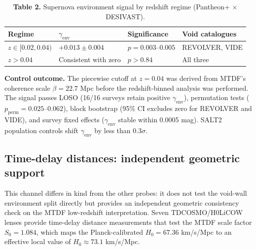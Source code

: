\documentclass[11pt,a4paper]{article}
\begin{document}
\begin{table}[H]
\centering
\footnotesize
\caption{\textbf{Table 2.} Supernova environment signal by redshift regime (Pantheon+ $\times$ DESIVAST).}
\begin{tabularx}{\linewidth}{l>{\RaggedRight\arraybackslash}X>{\RaggedRight\arraybackslash}X>{\RaggedRight\arraybackslash}X}
\toprule
\textbf{Regime} & \textbf{\(\gamma_\mathrm{env}\)} & \textbf{Significance} & \textbf{Void catalogues} \tabularnewline
\midrule
\(z \in [0.02, 0.04)\) & \(+0.013 \pm 0.004\) & \(p = 0.003\text{--}0.005\) & REVOLVER, VIDE \tabularnewline
\(z > 0.04\) & Consistent with zero & \(p > 0.84\) & All three \tabularnewline
\bottomrule
\end{tabularx}
\end{table}

\begin{mdframed}[linecolor=accent,linewidth=0.5pt,backgroundcolor=callout-bg,leftline=true,rightline=true,topline=true,bottomline=true,innerleftmargin=8pt,innerrightmargin=8pt,innertopmargin=6pt,innerbottommargin=6pt]
\textbf{Control outcome.} The piecewise cutoff at \(z = 0.04\) was derived from MTDF's coherence scale \(\beta = 22.7\) Mpc before the redshift-binned analysis was performed. The signal passes LOSO (16/\allowbreak{}16 surveys retain positive \(\gamma_\mathrm{env}\)), permutation tests (\(p_\mathrm{perm} = 0.025\text{--}0.062\)), block bootstrap (95\% CI excludes zero for REVOLVER and VIDE), and survey fixed effects (\(\gamma_\mathrm{env}\) stable within 0.0005 mag). SALT2 population controls shift \(\gamma_\mathrm{env}\) by less than 0.3\(\sigma\).
\end{mdframed}

\subsection{Time-delay distances: independent geometric support}
This channel differs in kind from the other probes: it does not test the void-wall environment split directly but provides an independent geometric consistency check on the MTDF low-redshift interpretation. Seven TDCOSMO/\allowbreak{}H0LiCOW lenses provide time-delay distance measurements that test the MTDF scale factor \(S_0 = 1.084\), which maps the Planck-calibrated \(H_0 = 67.36\) km/\allowbreak{}s/\allowbreak{}Mpc to an effective local value of \(H_0 \approx 73.1\) km/\allowbreak{}s/\allowbreak{}Mpc.
\end{document}
